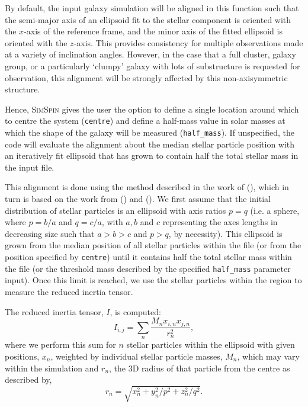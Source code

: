 \documentclass[
  journal=pasa,
  manuscript=research-paper, %
  year=2020,
  volume=37,
]{cup-journal}
\newcommand{\simspin}[1]{\textsc{SimSpin}#1} %
\newcommand{\citetoggle}[1]{\citeauthor{#1} (\citeyear{#1})}
\begin{document}
By default, the input galaxy simulation will be aligned in this function such that the semi-major axis of an ellipsoid fit to the stellar component is oriented with the $x$-axis of the reference frame, and the minor axis of the fitted ellipsoid is oriented with the $z$-axis. 
This provides consistency for multiple observations made at a variety of inclination angles. 
However, in the case that a full cluster, galaxy group, or a particularly `clumpy' galaxy with lots of substructure is requested for observation, this alignment will be strongly affected by this non-axisymmetric structure. 

Hence, \simspin{} gives the user the option to define a single location around which to centre the system (\texttt{centre}) and define a half-mass value in solar masses at which the shape of the galaxy will be measured (\texttt{half\_mass}). 
If unspecified, the code will evaluate the alignment about the median stellar particle position with an iteratively fit ellipsoid that has grown to contain half the total stellar mass in the input file. 

This alignment is done using the method described in the work of \citetoggle{Bassett2019GalaxyShapes},  which in turn is based on the work from \citetoggle{Li2018TheShapesIllustris} and \citetoggle{Allgood2006ShapeDarkMatterHaloes}.
We first assume that the initial distribution of stellar particles is an ellipsoid with axis ratios $p = q$ (i.e. a sphere, where $p = b/a$ and $q = c/a$, with $a, b$ and $c$ representing the axes lengths in decreasing size such that $a > b > c$ and $p > q$, by necessity).  
This ellipsoid is grown from the median position of all stellar particles within the file (or from the position specified by \texttt{centre}) until it contains half the total stellar mass within the file (or the threshold mass described by the specified \texttt{half\_mass} parameter input). 
Once this limit is reached, we use the stellar particles within the region to measure the reduced inertia tensor. 

The reduced inertia tensor, $I$, is computed:
\begin{equation}
    I_{i,j} = \sum_n{\frac{M_n x_{i,n} x_{j,n}}{r^2_n}},
\end{equation}
where we perform this sum for $n$ stellar particles within the ellipsoid with given positions, $x_n$, weighted by individual stellar particle masses, $M_n$, which may vary within the simulation and $r_n$, the 3D radius of that particle from the centre as described by,  
\begin{equation}
r_n = \sqrt{x_n^2 + y_n^2 / p^2 + z_n^2 / q^2}.    
\end{equation}
\end{document}
